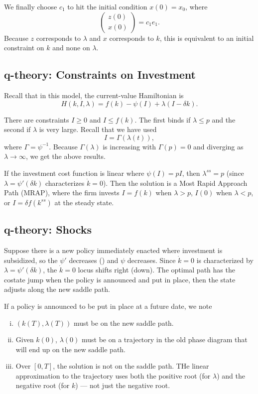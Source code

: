 \documentclass{tufte-handout}
\theoremstyle{definition}
\begin{document}
We finally choose $c_1$ to hit the initial condition $x(0) = x_0$, where \[
	\begin{pmatrix}
	 z(0) \\
	x(0)
	\end{pmatrix} = c_1 e_1
.\] Because $z$ corresponds to $\lambda$ and $x$ corresponds to $k$, this is equivalent to an initial constraint on $k$ and none on $\lambda$.   

\subsection{q-theory: Constraints on Investment}
Recall that in this model, the current-value Hamiltonian is \[
	H(k,I,\lambda) = f(k) - \psi(I) + \lambda(I-\delta k)
.\] 

There are constraints $I \ge 0$ and $I \le f(k)$. The first binds if $\lambda \le p$ and the second if $\lambda$ is very large. Recall that we have used \[
	I = \Gamma(\lambda(t))
,\] where $\Gamma = \psi^{-1}$. Because $\Gamma(\lambda)$ is increasing with $\Gamma(p) = 0$ and diverging as $\lambda \to \infty$, we get the above results.

If the investment cost function is linear where $\psi(I) = pI$, then $\lambda^{ss} = p$ (since $\lambda = \psi'(\delta k)$ characterizes $\dot{k} = 0$). Then the solution is a Most Rapid Approach Path (MRAP), where the firm invests $I = f(k)$ when $\lambda > p$, $I(0)$ when $\lambda < p$, or $I = \delta f(k^{ss})$ at the steady state.

\subsection{q-theory: Shocks}

Suppose there is a new policy immediately enacted where investment is subsidized, so the $\psi'$ decreases () and $\psi$ decreases. Since $\dot{k} = 0$ is characterized by $\lambda = \psi'(\delta k)$, the $\dot{k} = 0$ locus shifts right (down). The optimal path has the costate jump when the policy is announced and put in place, then the state adjusts along the new saddle path.

If a policy is announced to be put in place at a future date, we note
\begin{enumerate}[(i)]
	\item $\left( k(T) , \lambda(T) \right)$ must be on the new saddle path. 
	\item Given $k(0)$, $\lambda(0)$ must be on a trajectory in the old phase diagram that will end up on the new saddle path.
	\item Over $[0,T]$, the solution is not on the saddle path. THe linear approximation to the trajectory uses both the positive root (for $\lambda$) and the negative root (for $k$) --- not just the negative root.
\end{enumerate}
\end{document}
